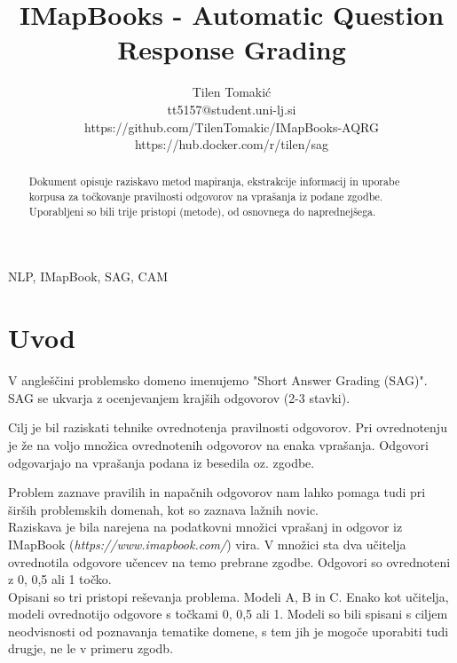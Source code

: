 \documentclass[journal]{IEEEtran}
\begin{document}
\title{IMapBooks - Automatic Question Response Grading}
\author{Tilen Tomakić\\tt5157@student.uni-lj.si\\https://github.com/TilenTomakic/IMapBooks-AQRG\\https://hub.docker.com/r/tilen/sag}%
\maketitle

\begin{abstract}	
  Dokument opisuje raziskavo metod mapiranja, ekstrakcije informacij in uporabe korpusa za točkovanje pravilnosti odgovorov na vprašanja iz podane zgodbe. Uporabljeni so bili trije pristopi (metode), od osnovnega do naprednejšega.
\end{abstract}

\begin{IEEEkeywords}
NLP, IMapBook, SAG, CAM
\end{IEEEkeywords}

\IEEEpeerreviewmaketitle

\section{Uvod}
V angleščini problemsko domeno imenujemo "Short Answer Grading (SAG)". SAG se ukvarja z ocenjevanjem krajših odgovorov (2-3 stavki).

Cilj je bil raziskati tehnike ovrednotenja pravilnosti odgovorov. Pri ovrednotenju je že na voljo množica ovrednotenih odgovorov na enaka vprašanja. Odgovori odgovarjajo na vprašanja podana iz besedila oz. zgodbe.

Problem zaznave pravilih in napačnih odgovorov nam lahko pomaga tudi pri širših problemskih domenah, kot so zaznava lažnih novic.\\

Raziskava je bila narejena na podatkovni množici vprašanj in odgovor iz IMapBook (\textit{https://www.imapbook.com/}) vira. V množici sta dva učitelja ovrednotila odgovore učencev na temo prebrane zgodbe. Odgovori so ovrednoteni z 0, 0,5 ali 1 točko.\\

Opisani so tri pristopi reševanja problema. Modeli A, B in C. Enako kot učitelja, modeli ovrednotijo odgovore s točkami 0, 0,5 ali 1. Modeli so bili spisani s ciljem neodvisnosti od poznavanja tematike domene, s tem jih je mogoče uporabiti tudi drugje, ne le v primeru zgodb.
\end{document}
